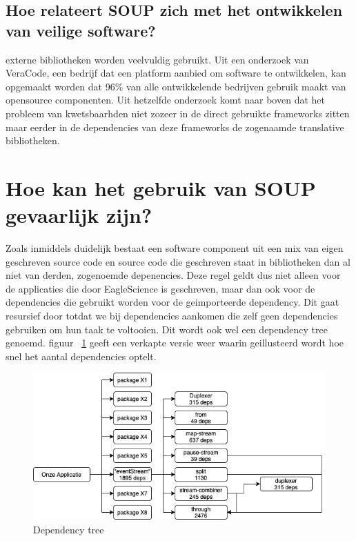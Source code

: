 \subsection{Hoe relateert SOUP zich met het ontwikkelen van veilige software?}\label{subsec:hoe-relateert-soup-zich-met-het-ontwikkelen-van-veilige-software?}
externe bibliotheken worden veelvuldig gebruikt. Uit een onderzoek van VeraCode, een bedrijf dat een platform aanbied om software te ontwikkelen, kan opgemaakt worden dat 96\% van alle ontwikkelende bedrijven gebruik maakt van opensource componenten. Uit hetzelfde onderzoek komt naar boven dat het probleem van kwetsbaarhden niet zozeer in de direct gebruikte frameworks zitten maar eerder in de dependencies van deze frameworks de zogenaamde translative bibliotheken.


\section{Hoe kan het gebruik van SOUP gevaarlijk zijn?}\label{sec:hoe-kan-het-gebruik-van-soup-gevaarlijk-zijn?}
Zoals inmiddels duidelijk bestaat een software component uit een mix van eigen geschreven source code en source code die geschreven staat in bibliotheken dan al niet van derden, zogenoemde depenencies. Deze regel geldt dus niet alleen voor de applicaties die door EagleScience is geschreven, maar dan ook voor de dependencies die gebruikt worden voor de geimporteerde dependency. Dit gaat resursief door totdat we bij dependencies aankomen die zelf geen dependencies gebruiken om hun taak te voltooien. Dit wordt ook wel een dependency tree genoemd. figuur ~\ref{fig:dependency-tree} geeft een verkapte versie weer waarin geillusteerd wordt hoe snel het aantal dependencies optelt.
\begin{figure}[H]
    \myfloatalign
    \includegraphics[width=12cm]{gfx/dependencyTree}
    \caption{Dependency tree}\label{fig:dependency-tree}
\end{figure}

